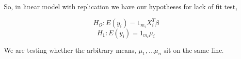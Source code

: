 \documentclass[11pt,fleqn]{book} %
\begin{document}
So, in linear model with replication we have our hypotheses for lack of fit test, 

$$H_O: E(y_i) = 1_{m_i} X_i^T \beta$$
$$H_1: E(y_i) = 1_{m_i} \mu_i $$


We are testing whether the arbitrary means, $\mu_1, \dots \mu_n$ sit on the same line. 


















\end{document}
